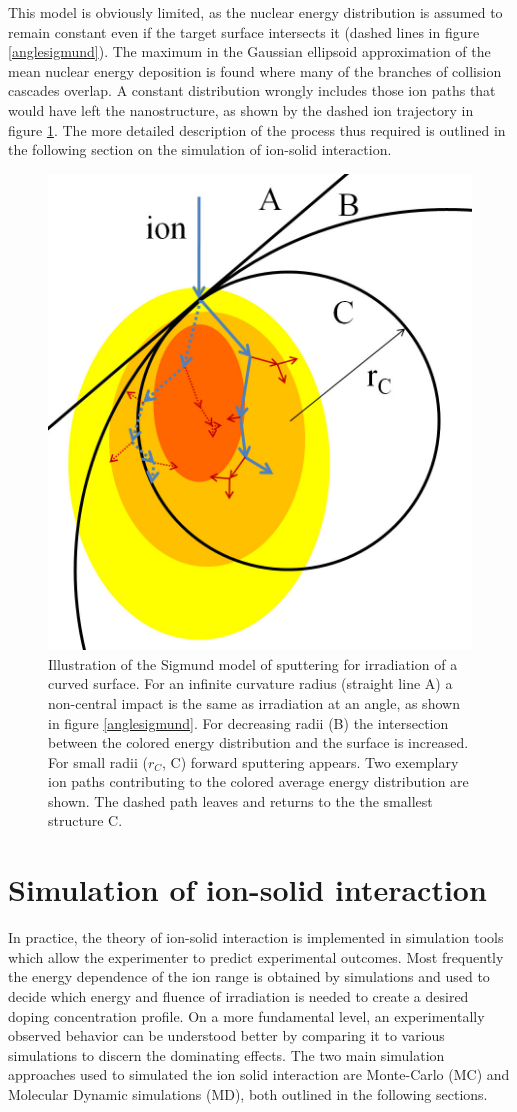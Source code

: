This model is obviously limited, as the nuclear energy distribution is assumed to remain constant even if the target surface intersects it (dashed lines in figure \ref{anglesigmund}). The maximum in the Gaussian ellipsoid approximation of the mean nuclear energy deposition is found where many of the branches of collision cascades overlap. A constant distribution wrongly includes those ion paths that would have left the nanostructure, as shown by the dashed ion trajectory in figure \ref{radiussigmund}. The more detailed description of the process thus required is outlined in the following section on the simulation of ion-solid interaction.

\begin{figure}
	\centering
		\includegraphics[width=.35\textwidth]{images/radiussigmund.jpg}
	\caption{Illustration of the Sigmund model of sputtering for irradiation of a curved surface. For an infinite curvature radius (straight line A) a non-central impact is the same as irradiation at an angle, as shown in figure \ref{anglesigmund}. For decreasing radii (B) the intersection between the colored energy distribution and the surface is increased. For small radii ($r_C$, C) forward sputtering appears. Two exemplary ion paths contributing to the colored average energy distribution are shown. The dashed path leaves and returns to the the smallest structure C.}
	\label{radiussigmund}
\end{figure} 


\section{Simulation of ion-solid interaction}
\label{sec:simion}

In practice, the theory of ion-solid interaction is implemented in simulation tools which allow the experimenter to predict experimental outcomes. Most frequently the energy dependence of the ion range is obtained by simulations and used to decide which energy and fluence of irradiation is needed to create a desired doping concentration profile. On a more fundamental level, an experimentally observed behavior can be understood better by comparing it to various simulations to discern the dominating effects. The two main simulation approaches used to simulated the ion solid interaction are Monte-Carlo (MC) and Molecular Dynamic simulations (MD), both outlined in the following sections.


